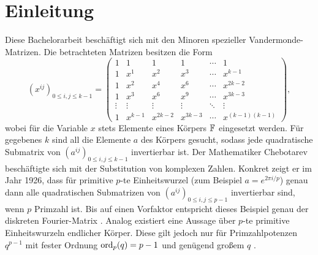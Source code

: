 \section{Einleitung}

Diese Bachelorarbeit beschäftigt sich mit den Minoren spezieller Vandermonde-Matrizen. Die betrachteten Matrizen besitzen die Form \begin{equation*}
    \left( x^{ij} \right)_{0\leq i,j \leq k-1} = \begin{pmatrix}
        1     & 1    & 1    & 1    &\cdots& 1 \\
        1     & x^1  & x^2  & x^3  &\cdots& x^{k-1} \\
        1     & x^2  & x^4  & x^6  &\cdots& x^{2k-2} \\
        1     & x^3  & x^6  & x^9  &\cdots& x^{3k-3} \\
        \vdots&\vdots&\vdots&\vdots&\ddots&\vdots \\
        1     &x^{k-1}&x^{2k-2}&x^{3k-3}&\cdots&x^{(k-1)(k-1)}
    \end{pmatrix},
\end{equation*}
wobei für die Variable $x$ stets Elemente eines Körpers $\field{}$ eingesetzt werden. Für gegebenes $k$ sind all die Elemente $a$ des Körpers gesucht, sodass jede quadratische Submatrix von $\left( a^{ij} \right)_{0\leq i,j \leq k-1}$ invertierbar ist. Der Mathematiker Chebotarev beschäftigte sich mit der Substitution von komplexen Zahlen. Konkret zeigt er im Jahr 1926, dass für primitive $p$-te Einheitswurzel (zum Beispiel $a=e^{2\pi i/p}$) genau dann alle quadratischen Submatrizen von $\left( a^{ij} \right)_{0\leq i,j \leq p-1}$ invertierbar sind, wenn $p$ Primzahl ist. Bis auf einen Vorfaktor entspricht dieses Beispiel genau der diskreten Fourier-Matrix \cite{CheboProof}. Analog existiert eine Aussage über $p$-te primitive Einheitswurzeln endlicher Körper. Diese gilt jedoch nur für Primzahlpotenzen $q^{p-1}$ mit fester Ordnung $\ord{q}[p] = p-1$ und genügend großem $q$ \cite{CheboFiniteFields}.

